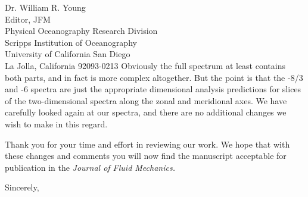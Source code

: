 \documentclass[11pt]{letter}
\begin{document}
\begin{letter}{Dr. William R. Young \\
 Editor, JFM \\
 Physical Oceanography Research Division \\
 Scripps Institution of Oceanography \\
 University of California San Diego \\
 La Jolla, California 92093-0213
 }
Obviously the full spectrum at least contains both parts, and in fact
is more complex altogether.  But the point is that the -8/3 and -6
spectra are just the appropriate dimensional analysis predictions for
slices of the two-dimensional spectra along the zonal and meridional
axes. We have carefully looked again at our spectra, and there are
no additional changes we wish to make in this regard. 

Thank you for your time and effort in reviewing our work.  We hope
that with these changes and comments you will now find the 
manuscript acceptable for publication in the \textit{Journal of 
Fluid Mechanics.}

\closing{Sincerely,}


\end{letter}
\end{document}
